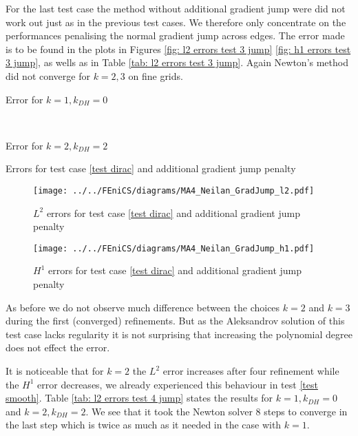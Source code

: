 
For the last test case the method without additional gradient jump were did not work out just as in the previous test cases. We therefore only concentrate on the performances penalising the normal gradient jump across edges. The error made is to be found in the plots in Figures \ref{fig: l2 errors test 3 jump} \ref{fig: h1 errors test 3 jump}, as wells as in Table \ref{tab: l2 errors test 3 jump}. Again Newton's method did not converge for $k=2,3$ on fine grids. 
\begin{table}[H]
	\begin{subtable}[b]{0.45\textwidth}
		\centering
		\pgfplotstabletypeset[columns={iterations, l2error, h1error,N},
		every row 0 column 0/.style={set content=init},
		]{\MAFourJumpdegOneZero}
		\caption{Error for $k=1, k_{DH}=0$}
	\end{subtable}
	~
	\begin{subtable}[b]{0.45\textwidth}
		\centering
		\pgfplotstabletypeset[
		columns={iterations, l2error, h1error,N},
		every row 0 column 0/.style={set content=init},
		]{\MAFourJumpdegTwoTwo}
		\caption{Error for $k=2, k_{DH}=2$}
	\end{subtable}
	\caption{Errors for test case \ref{test dirac} and additional gradient jump penalty}
	\label{tab: l2 errors test 4 jump}
\end{table}


\begin{figure}[H]
	\centering
		\centering
		\texttt{[image: ../../FEniCS/diagrams/MA4\_Neilan\_GradJump\_l2.pdf]}
	\caption{$L^2$ errors for test case \ref{test dirac} and additional gradient jump penalty}
	\label{fig: l2 errors test 4 jump}
\end{figure}
	
\begin{figure}[H]
		\centering
		\texttt{[image: ../../FEniCS/diagrams/MA4\_Neilan\_GradJump\_h1.pdf]}
	\caption{$H^1$ errors for test case \ref{test dirac} and additional gradient jump penalty}
	\label{fig: h1 errors test 4 jump}
\end{figure}
As before we do not observe much difference between the choices $k=2$ and $k=3$ during the first (converged) refinements. But as the Aleksandrov solution of this test case lacks regularity it is not surprising that increasing the polynomial degree does not effect the error.

It is noticeable that for $k=2$ the $L^2$ error increases after four refinement while the $H^1$ error decreases, we already experienced this behaviour in test \ref{test smooth}. Table \ref{tab: l2 errors test 4 jump} states the results for $k=1, k_{DH}=0$ and $k=2, k_{DH}=2$. We see that it took the Newton solver 8 steps to converge in the last step which is twice as much as it needed in the case with $k=1$.
